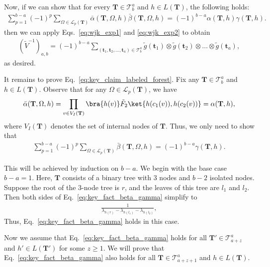 \documentclass[superscriptaddress,onecolumn,nofootinbib,longbibliography,a4paper,accepted=2026-09-29]{quantumarticle}
\theoremstyle{plain}
\theoremstyle{definition}
\numberwithin{thm}{section}
\numberwithin{assumption}{section}
\numberwithin{lemma}{section}
\numberwithin{prop}{section}
\numberwithin{cor}{section}
\numberwithin{definition}{section}
\numberwithin{rmk}{section}
\numberwithin{equation}{section}
\newcommand{\lrb}[1]{\left ( #1 \right )}
\newcommand{\mbt}{\mathbf{t}}
\newcommand{\mbf}{\mathbf{T}}
\begin{document}
Now, if we can show that for every $\mbf \in \mathcal{T}^a_b$ and $h \in L(\mbf)$, the following holds:
\begin{align}
\sum_{p=1}^{b-a} (-1)^p
    \sum_{\Omega \in \mathcal{L}_{p}(\mbf)} 
 \bar{\alpha}(\mbf, \Omega, h)
\bar{\beta}(\mbf, \Omega, h)
= (-1)^{b-a} \alpha(\mbf, h) \gamma(\mbf, h).
\label{eq:key_claim_labeled_forest}
\end{align}
then we can apply Eqs.~\eqref{eq:wjk_exp1} and \eqref{eq:wjk_exp2} to obtain 
\begin{align}
\lrb{\tilde{V}^{-1}}_{a,b} = (-1)^{b-a} \sum_{(\mbt_1,\mbt_2,\dots,\mbt_a) \in \mathcal{T}^a_b} \tilde{g}(\mbt_1) \otimes \tilde{g}(\mbt_2) \otimes \dots \otimes \tilde{g}(\mbt_a),    
\end{align}
as desired.

It remains to prove Eq.~\eqref{eq:key_claim_labeled_forest}. Fix any $\mbf \in \mathcal{T}^a_b$ and $h \in L(\mbf)$. Observe that for any $\Omega \in \mathcal{L}_{p}(\mbf)$, we have
\begin{align}
 \bar{\alpha}(\mbf, \Omega, h)
=\prod_{v \in V_I(\mbf)} \bra{h(v)}\tilde{F}_2\ket{h(c_1(v)), h(c_2(v))}
=\alpha(\mbf, h),
\end{align}
where $V_I(\mbf)$ denotes the set of internal nodes of $\mbf$. Thus, we only need to show that 
\begin{align}
 \sum_{p=1}^{b-a} (-1)^p
    \sum_{\Omega \in \mathcal{L}_{p}(\mbf)} 
\bar{\beta}(\mbf, \Omega, h)
 = (-1)^{b-a} \gamma(\mbf, h).
\label{eq:key_fact_beta_gamma}
\end{align}

This will be achieved by induction on $b-a$. We begin with the base case $b-a=1$. Here, $\mbf$ consists of a binary tree with $3$ nodes and $b-2$ isolated nodes. Suppose the root of the $3$-node tree is $r$, and the leaves of this tree are $l_1$ and $l_2$.
Then both sides of Eq.~\eqref{eq:key_fact_beta_gamma} simplify  to 
\begin{align}
\frac{1}{\lambda_{h(r)}-\lambda_{h(l_1)}-\lambda_{h(l_2)}},   
\end{align}
Thus, Eq.~\eqref{eq:key_fact_beta_gamma} holds in this case. 

Now we assume that Eq.~\eqref{eq:key_fact_beta_gamma} holds for all $\mbf' \in \mathcal{T}^{a}_{a+z}$ and $h' \in L(\mbf')$ for some $z \ge 1$.  We will prove that Eq.~\eqref{eq:key_fact_beta_gamma} also holds for all $\mbf \in \mathcal{T}^{a}_{a+z+1}$ and $h \in L(\mbf)$.
\end{document}
